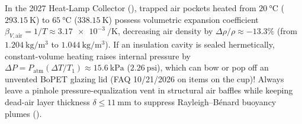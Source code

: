 \begin{devicebox}
In the 2027 Heat-Lamp Collector (), trapped air pockets heated from $\SI{20}{\celsius}$ ($\SI{293.15}{\kelvin}$) to $\SI{65}{\celsius}$ ($\SI{338.15}{\kelvin}$) possess volumetric expansion coefficient $\beta_{V,\mathrm{air}} = 1/T \approx \SI{3.17e-3}{\per\kelvin}$, decreasing air density by $\Delta\rho/\rho \approx -13.3\%$ (from $\SI{1.204}{\kilogram\per\cubic\meter}$ to $\SI{1.044}{\kilogram\per\cubic\meter}$). If an insulation cavity is sealed hermetically, constant-volume heating raises internal pressure by $\Delta P = P_{\mathrm{atm}}(\Delta T/T_1) \approx \SI{+15.6}{\kilo\pascal}$ ($\SI{2.26}{\text{psi}}$), which can bow or pop off an unvented BoPET glazing lid (FAQ 10/21/2026 on items on the cup)! Always leave a pinhole pressure-equalization vent in structural air baffles while keeping dead-air layer thickness $\delta \le \SI{11}{\milli\meter}$ to suppress Rayleigh--B\'enard buoyancy plumes ().
\end{devicebox}

